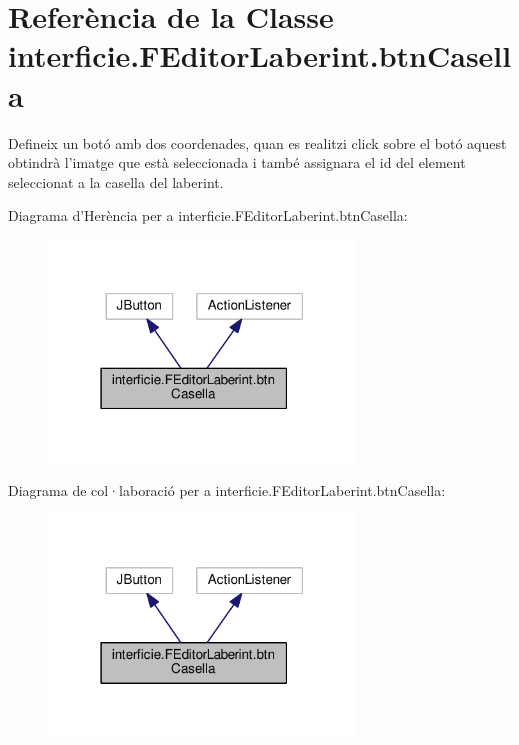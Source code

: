 \hypertarget{classinterficie_1_1_f_editor_laberint_1_1btn_casella}{\section{Referència de la Classe interficie.\+F\+Editor\+Laberint.\+btn\+Casella}
\label{classinterficie_1_1_f_editor_laberint_1_1btn_casella}
}


Defineix un botó amb dos coordenades, quan es realitzi click sobre el botó aquest obtindrà l'imatge que està seleccionada i també assignara el id del element seleccionat a la casella del laberint.  




Diagrama d'Herència per a interficie.\+F\+Editor\+Laberint.\+btn\+Casella\+:
\nopagebreak
\begin{figure}[H]
\begin{center}
\leavevmode
\includegraphics[width=231pt]{classinterficie_1_1_f_editor_laberint_1_1btn_casella__inherit__graph}
\end{center}
\end{figure}


Diagrama de col·laboració per a interficie.\+F\+Editor\+Laberint.\+btn\+Casella\+:
\nopagebreak
\begin{figure}[H]
\begin{center}
\leavevmode
\includegraphics[width=231pt]{classinterficie_1_1_f_editor_laberint_1_1btn_casella__coll__graph}
\end{center}
\end{figure}
